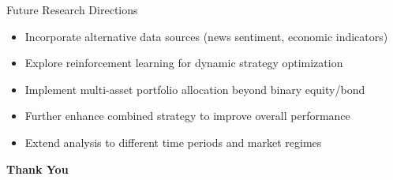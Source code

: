 \documentclass[aspectratio=169,xcolor=dvipsnames]{beamer}
\begin{document}
\begin{frame}{Future Research Directions}
	\begin{itemize}
		\item Incorporate alternative data sources (news sentiment, economic indicators)
		\item Explore reinforcement learning for dynamic strategy optimization
		\item Implement multi-asset portfolio allocation beyond binary equity/bond
		\item Further enhance combined strategy to improve overall performance
		\item Extend analysis to different time periods and market regimes
	\end{itemize}
\end{frame}

\begin{frame}
	\Huge{\centerline{\textbf{Thank You}}}
\end{frame}

\end{document}
